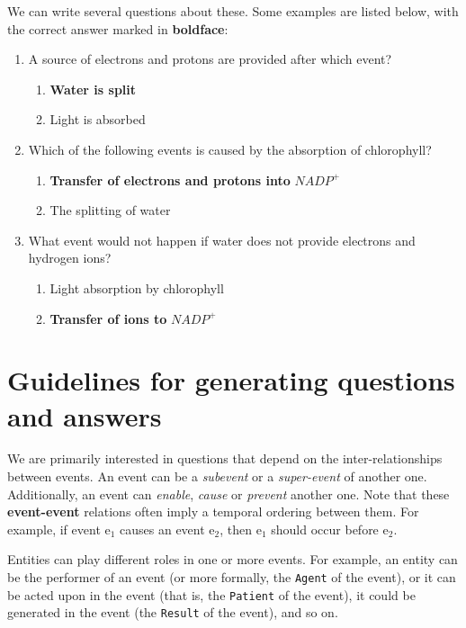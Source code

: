 \documentclass[11pt]{article}
\begin{document}
  We can write several questions about these. Some examples are listed
  below, with the correct answer marked in \textbf{boldface}:
  
\begin{enumerate}
\item A source of electrons and protons are provided after which
     event?
\begin{enumerate}
\item \textbf{Water is split}
\item Light is absorbed
\end{enumerate}
\item Which of the following events is caused by the absorption of
     chlorophyll?
\begin{enumerate}
\item \textbf{Transfer of electrons and protons into} $NADP^+$
\item The splitting of water
\end{enumerate}
\item What event would not happen if water does not provide electrons
     and hydrogen ions?
\begin{enumerate}
\item Light absorption by chlorophyll
\item \textbf{Transfer of ions to} $NADP^+$
\end{enumerate}
\end{enumerate}
\section{Guidelines for generating questions and answers}
\label{sec-3}

  We are primarily interested in questions that depend on the
  inter-relationships between events. An event can be a \emph{subevent} or
  a \emph{super-event} of another one. Additionally, an event can
  \emph{enable}, \emph{cause} or \emph{prevent} another one. Note that
  these \textbf{event-event} relations often imply a temporal ordering
  between them. For example, if event e$_1$ causes an event e$_2$, then
  e$_1$ should occur before e$_2$.

  Entities can play different roles in one or more events. For
  example, an entity can be the performer of an event (or more
  formally, the \texttt{Agent} of the event), or it can be acted upon in the
  event (that is, the \texttt{Patient} of the event), it could be generated
  in the event (the \texttt{Result} of the event), and so on.
\end{document}
